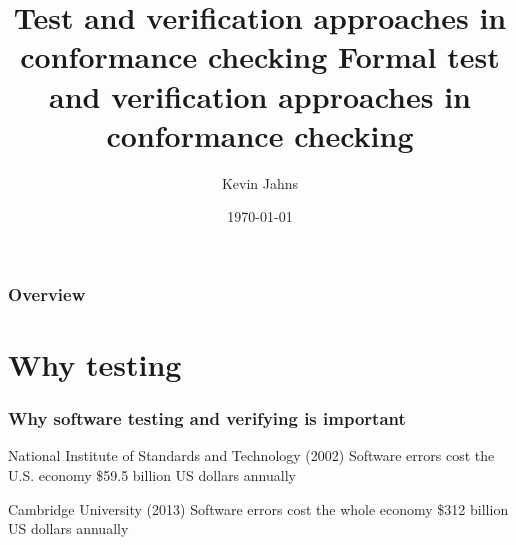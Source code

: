 \documentclass{beamer}
\title[MBT]{Test and verification approaches in conformance checking} %
\author{Kevin Jahns} %
\institute[] %
{
RWTH Aachen University \\ %
\medskip
\textit{kevin.jahns@rwth-aachen.de} %
}
\date{\today} %
\begin{document}
\begin{frame}
\titlepage %
\end{frame}
\title[MBT]{{\color{red} Formal} test and verification approaches in
conformance checking}
\begin{frame}
\titlepage %
\end{frame}

\begin{frame}
\frametitle{Overview} %
\tableofcontents %
\end{frame}


\section{Why testing}
\begin{frame}
\frametitle{Why software testing and verifying is important}
\begin{block}{National Institute of Standards and Technology (2002)}
Software errors cost the U.S. economy \$59.5 billion US dollars
annually \cite{nist}
\end{block}
\begin{block}{Cambridge University (2013)}
Software errors cost the whole economy \$312 billion US dollars
annually \cite{cambridge_errors}
\end{block}
\end{frame}
\end{document}
